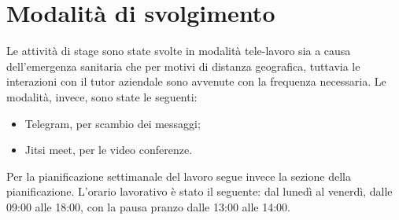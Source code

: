 \section{Modalità di svolgimento}\label{sec:modalita-di-svolgimento}
Le attività di stage sono state svolte in modalità tele-lavoro sia a causa dell'emergenza sanitaria che per motivi di distanza geografica, tuttavia le interazioni con il tutor aziendale sono avvenute con la frequenza necessaria.
Le modalità, invece, sono state le seguenti:
\begin{itemize}
    \item Telegram, per scambio dei messaggi;
    \item Jitsi meet, per le video conferenze.
\end{itemize}
Per la pianificazione settimanale del lavoro segue invece la sezione della pianificazione.
L'orario lavorativo è stato il seguente: dal lunedì al venerdì, dalle 09:00 alle 18:00, con la pausa pranzo dalle 13:00 alle 14:00.